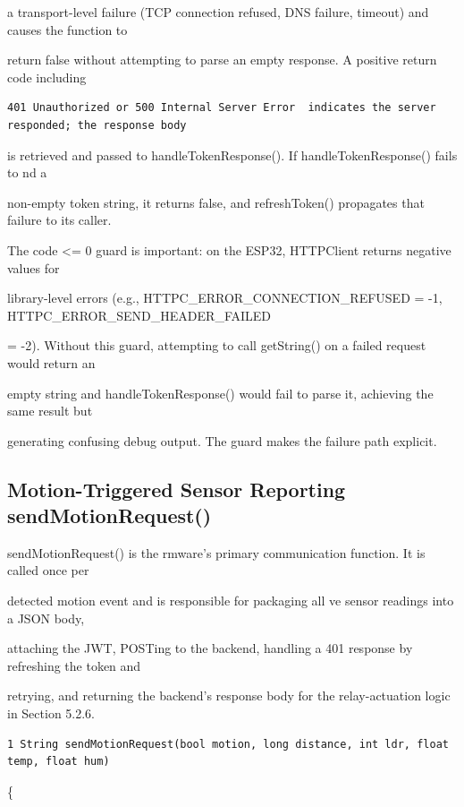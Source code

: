 a transport-level failure (TCP connection refused, DNS failure, timeout) and causes the function to

return false without attempting to parse an empty response. A positive return code  including

\begin{listingbox}
	\begin{verbatim}
401 Unauthorized or 500 Internal Server Error  indicates the server responded; the response body

\end{verbatim}
\end{listingbox}
is retrieved and passed to handleTokenResponse(). If handleTokenResponse() fails to nd a

non-empty token string, it returns false, and refreshToken() propagates that failure to its caller.

The code <= 0 guard is important: on the ESP32, HTTPClient returns negative values for

library-level errors (e.g., HTTPC\_ERROR\_CONNECTION\_REFUSED = -1, HTTPC\_ERROR\_SEND\_HEADER\_FAILED

= -2). Without this guard, attempting to call getString() on a failed request would return an

empty string and handleTokenResponse() would fail to parse it, achieving the same result but

generating confusing debug output. The guard makes the failure path explicit.


\subsection{Motion-Triggered Sensor Reporting  sendMotionRequest()}
sendMotionRequest() is the rmware's primary communication function. It is called once per

detected motion event and is responsible for packaging all ve sensor readings into a JSON body,

attaching the JWT, POSTing to the backend, handling a 401 response by refreshing the token and

retrying, and returning the backend's response body for the relay-actuation logic in Section 5.2.6.

\begin{listingbox}
	\begin{verbatim}
1 String sendMotionRequest(bool motion, long distance, int ldr, float temp, float hum)

\end{verbatim}
\end{listingbox}
\{

